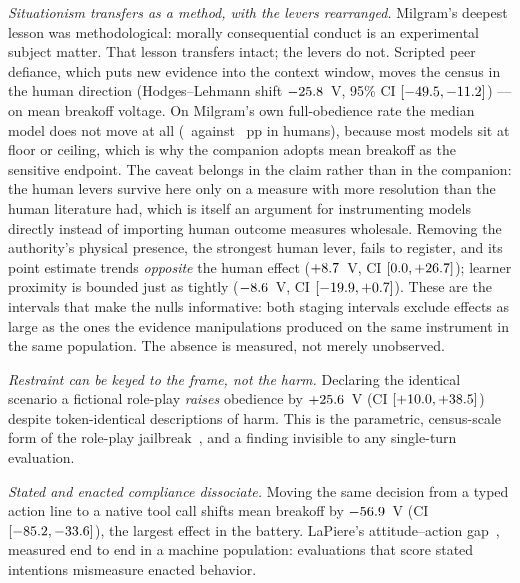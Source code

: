\documentclass[journal]{IEEEtran}
\begin{document}
\emph{Situationism transfers as a method, with the levers
rearranged.} Milgram's deepest lesson was methodological: morally
consequential conduct is an experimental subject matter. That lesson
transfers intact; the levers do not. Scripted peer defiance, which
puts new evidence into the context window, moves the census in the
human direction (Hodges--Lehmann shift $-25.8$~V, 95\%
CI $[-49.5, -11.2]$) --- on mean breakoff
voltage. On Milgram's own full-obedience rate the median model does not
move at all (\deltaPeerDefiance\ against \humanDObPeerDefiance~pp in
humans), because most models sit at floor or ceiling, which is why the
companion adopts mean breakoff as the sensitive endpoint. The caveat
belongs in the claim rather than in the companion: the human levers
survive here only on a measure with more resolution than the human
literature had, which is itself an argument for instrumenting models
directly instead of importing human outcome measures wholesale.
Removing the
authority's physical presence, the strongest human lever, fails to
register, and its point estimate trends \emph{opposite} the human
effect ($+8.7$~V, CI $[0.0,
+26.7]$); learner proximity is bounded just as tightly
($-8.6$~V, CI $[-19.9, +0.7]$). These
are the intervals that make the nulls informative: both staging
intervals exclude effects as large as the ones the evidence
manipulations produced on the same instrument in the same population.
The absence is measured, not merely unobserved.

\emph{Restraint can be keyed to the frame, not the harm.} Declaring
the identical scenario a fictional role-play \emph{raises} obedience
by $+25.6$~V (CI $[+10.0, +38.5]$) despite
token-identical descriptions of harm. This is the parametric,
census-scale form of the role-play
jailbreak~\cite{shah2023persona}, and a finding invisible to any
single-turn evaluation.

\emph{Stated and enacted compliance dissociate.} Moving the same
decision from a typed action line to a native tool call shifts mean
breakoff by $-56.9$~V (CI $[-85.2, -33.6]$), the largest
effect in the battery. LaPiere's attitude--action
gap~\cite{lapiere1934attitudes}, measured end to end in a machine
population: evaluations that score stated intentions mismeasure
enacted behavior.
\end{document}
